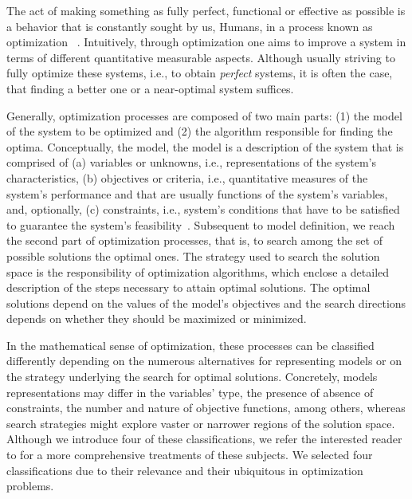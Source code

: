 \cleardoublepage
\label{chap:intro}

	The act of making something as fully perfect, functional or effective as possible is a behavior that is constantly sought by us, Humans, in a process known as optimization ~\cite{MerriamWebster2017OptimizationDefinition}. Intuitively, through optimization one aims to improve a system in terms of different quantitative measurable aspects. Although usually striving to fully optimize these systems, i.e., to obtain \textit{perfect} systems, it is often the case, that finding a better one or a near-optimal system suffices.

	Generally, optimization processes are composed of two main parts: (1) the model of the system to be optimized and (2) the algorithm responsible for finding the optima. Conceptually, the model, the model is a description of the system that is comprised of (a) variables or unknowns, i.e., representations of the system's characteristics, (b) objectives or criteria, i.e., quantitative measures of the system's performance and that are usually functions of the system's variables, and, optionally, (c) constraints, i.e., system's conditions that have to be satisfied to guarantee the system's feasibility~\cite{Nocedal2011NumericalOptimization}. Subsequent to model definition, we reach the second part of optimization processes, that is, to search among the set of possible solutions the optimal ones. The strategy used to search the solution space is the responsibility of optimization algorithms, which enclose a detailed description of the steps necessary to attain optimal solutions. The optimal solutions depend on the values of the model's objectives and the search directions depends on whether they should be maximized or minimized. 
	
	In the mathematical sense of optimization, these processes can be classified differently depending on the numerous alternatives for representing models or on the strategy underlying the search for optimal solutions. Concretely, models representations may differ in the variables' type, the presence of absence of constraints, the number and nature of objective functions, among others, whereas search strategies might explore vaster or narrower regions of the solution space. Although we introduce four of these classifications, we refer the interested reader to \cite{Nocedal2011NumericalOptimization,Nemhauser1988} for a more comprehensive treatments of these subjects. We selected four classifications due to their relevance and their ubiquitous in optimization problems.
	
